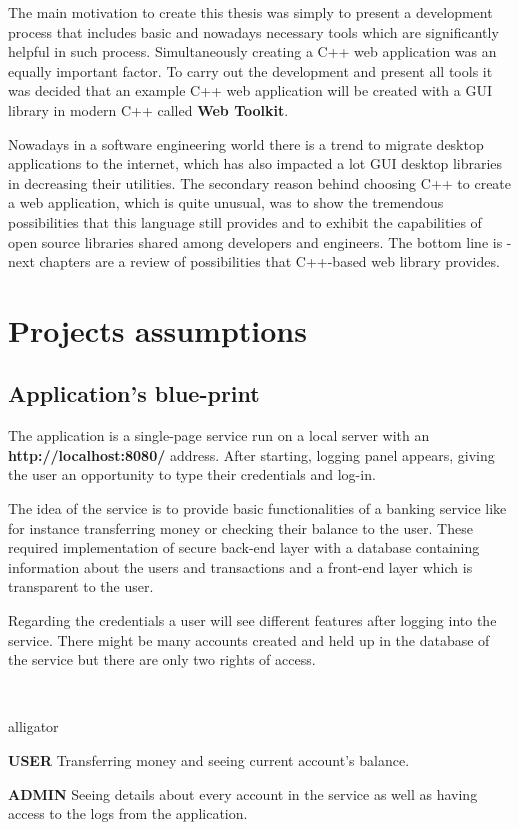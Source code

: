 \documentclass[a4paper,12pt]{book}
\begin{document}
{{\bigskip
The main motivation to create this thesis was simply to present a development process that includes basic and nowadays necessary tools which are significantly helpful in such process. Simultaneously creating a C++ web application was an equally important factor. To carry out the development and present all tools it was decided that an example C++ web application will be created with a GUI library in modern C++ called \textbf{Web Toolkit}. 

\bigskip 
Nowadays in a software engineering world there is a trend to migrate desktop applications to the internet, which has also impacted a lot GUI desktop libraries in decreasing their utilities. The secondary reason behind choosing C++ to create a web application, which is quite unusual, was to show the tremendous possibilities that this language still provides and to exhibit the capabilities of open source libraries shared among developers and engineers. The bottom line is - next chapters are a review of possibilities that C++-based web library provides.
}

\chapter{Projects assumptions}

\section{Application's blue-print}
{
The application is a single-page service run on a local server with an \textbf{http://localhost:8080/} address. After starting, logging panel appears, giving the user an opportunity to type their credentials and log-in. 

\bigskip
The idea of the service is to provide basic functionalities of a banking service like for instance transferring money or checking their balance to the user. These required implementation of secure back-end layer with a database containing information about the users and transactions and a front-end layer which is transparent to the user. 

\bigskip
Regarding the credentials a user will see different features after logging into the service. There might be many accounts created and held up in the database of the service but there are only two rights of access.}\\
\begin{labeling}{alligator}
\item [\textbf{USER}] Transferring money and seeing current account's balance.
\item [\textbf{ADMIN}] Seeing details about every account in the service as well as having access to the logs from the application.
\end{labeling}

}
\end{document}
